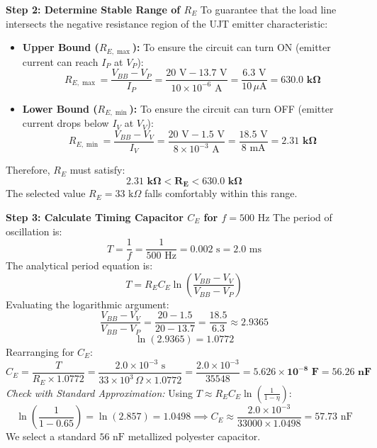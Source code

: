 \documentclass[11pt,a4paper]{article}
\begin{document}
\begin{examplebox}
\textbf{Step 2: Determine Stable Range of $R_E$}
To guarantee that the load line intersects the negative resistance region of the UJT emitter characteristic:
\begin{itemize}[leftmargin=*]
  \item \textbf{Upper Bound ($R_{E,\max}$):} To ensure the circuit can turn ON (emitter current can reach $I_P$ at $V_P$):
  \begin{equation}
  R_{E,\max} = \frac{V_{BB} - V_P}{I_P} = \frac{20\text{ V} - 13.7\text{ V}}{10 \times 10^{-6}\text{ A}} = \frac{6.3\text{ V}}{10\,\mu\text{A}} = \mathbf{630.0\text{ k}\Omega}
  \end{equation}
  \item \textbf{Lower Bound ($R_{E,\min}$):} To ensure the circuit can turn OFF (emitter current drops below $I_V$ at $V_V$):
  \begin{equation}
  R_{E,\min} = \frac{V_{BB} - V_V}{I_V} = \frac{20\text{ V} - 1.5\text{ V}}{8 \times 10^{-3}\text{ A}} = \frac{18.5\text{ V}}{8\text{ mA}} = \mathbf{2.31\text{ k}\Omega}
  \end{equation}
\end{itemize}
Therefore, $R_E$ must satisfy:
\begin{equation}
\mathbf{2.31\text{ k}\Omega < R_E < 630.0\text{ k}\Omega}
\end{equation}
The selected value $R_E = 33\text{ k}\Omega$ falls comfortably within this range.

\textbf{Step 3: Calculate Timing Capacitor $C_E$ for $f = 500\text{ Hz}$}
The period of oscillation is:
\begin{equation}
T = \frac{1}{f} = \frac{1}{500\text{ Hz}} = 0.002\text{ s} = 2.0\text{ ms}
\end{equation}
The analytical period equation is:
\begin{equation}
T = R_E C_E \ln\left(\frac{V_{BB} - V_V}{V_{BB} - V_P}\right)
\end{equation}
Evaluating the logarithmic argument:
\begin{equation}
\frac{V_{BB} - V_V}{V_{BB} - V_P} = \frac{20 - 1.5}{20 - 13.7} = \frac{18.5}{6.3} \approx 2.9365
\end{equation}
\begin{equation}
\ln(2.9365) = 1.0772
\end{equation}
Rearranging for $C_E$:
\begin{equation}
C_E = \frac{T}{R_E \times 1.0772} = \frac{2.0 \times 10^{-3}\text{ s}}{33 \times 10^3\,\Omega \times 1.0772} = \frac{2.0 \times 10^{-3}}{35548} = \mathbf{5.626 \times 10^{-8}\text{ F}} = \mathbf{56.26\text{ nF}}
\end{equation}
\textit{Check with Standard Approximation:} Using $T \approx R_E C_E \ln\left(\frac{1}{1-\eta}\right)$:
\begin{equation}
\ln\left(\frac{1}{1-0.65}\right) = \ln(2.857) = 1.0498 \implies C_E \approx \frac{2.0 \times 10^{-3}}{33000 \times 1.0498} = 57.73\text{ nF}
\end{equation}
We select a standard $56\text{ nF}$ metallized polyester capacitor.
\end{examplebox}
\end{document}
